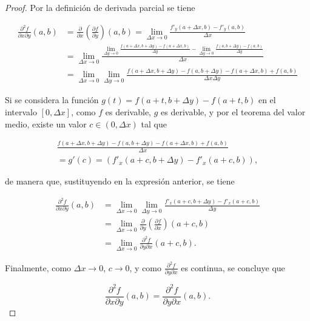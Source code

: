 \documentclass[
  a4paper,
]{scrreport}
\theoremstyle{definition}
\theoremstyle{plain}
\theoremstyle{plain}
\theoremstyle{definition}
\theoremstyle{definition}
\theoremstyle{plain}
\theoremstyle{remark}
\begin{document}
\begin{tcolorbox}[enhanced jigsaw, breakable, title=\textcolor{quarto-callout-note-color}{\faInfo}\hspace{0.5em}{Demostración}, toprule=.15mm, coltitle=black, arc=.35mm, rightrule=.15mm, colframe=quarto-callout-note-color-frame, colbacktitle=quarto-callout-note-color!10!white, toptitle=1mm, titlerule=0mm, leftrule=.75mm, opacityback=0, colback=white, bottomrule=.15mm, bottomtitle=1mm, left=2mm, opacitybacktitle=0.6]

\begin{proof}

Por la definición de derivada parcial se tiene

\begin{align*}
\frac{\partial^2 f}{\partial x \partial y} (a,b)
&= \frac{\partial}{\partial x}\left(\frac{\partial f}{\partial y}\right)(a,b) 
= \lim_{\Delta x\to 0} \frac{f'_y(a+\Delta x,b)-f'_y(a,b)}{\Delta x} \\
&= \lim_{\Delta x\to 0} \frac{\lim_{\Delta y\to 0}\frac{f(a+\Delta x,b+\Delta y)-f(a+\Delta x,b)}{\Delta y} - \lim_{\Delta y\to 0}\frac{f(a,b+\Delta y)-f(a,b)}{\Delta y}}{\Delta x} \\
&= \lim_{\Delta x\to 0}\lim_{\Delta y\to 0} \frac{f(a+\Delta x, b+\Delta y)- f(a,b+\Delta y) -f(a+\Delta x, b) + f(a,b)}{\Delta x \Delta y}
\end{align*}

Si se considera la función \(g(t) = f(a+t, b+\Delta y)-f(a+t,b)\) en el
intervalo \([0,\Delta x]\), como \(f\) es derivable, \(g\) es derivable,
y por el teorema del valor medio, existe un valor \(c\in (0,\Delta x)\)
tal que

\[
\begin{gathered}
\frac{f(a+\Delta x, b+\Delta y)- f(a,b+\Delta y) -f(a+\Delta x, b) + f(a,b)}{\Delta x} \\
= g'(c)
= (f'_x(a+c, b+\Delta y) - f'_x(a+c,b)),
\end{gathered}
\]

de manera que, sustituyendo en la expresión anterior, se tiene

\begin{align*}
\frac{\partial^2 f}{\partial x \partial y} (a,b)
&= \lim_{\Delta x\to 0}\lim_{\Delta y\to 0} \frac{f'_x(a+c, b+\Delta y) - f'_x(a+c,b)}{\Delta y} \\
&= \lim_{\Delta x\to 0}\frac{\partial}{\partial y}\left(\frac{\partial f}{\partial x}\right)(a+c, b) \\
&= \lim_{\Delta x\to 0}\frac{\partial^2 f}{\partial y\partial x}(a+c, b).
\end{align*}

Finalmente, como \(\Delta x \to 0\), \(c\to 0\), y como
\(\frac{\partial^2 f}{\partial y\partial x}\) es continua, se concluye
que

\[
\frac{\partial^2 f}{\partial x \partial y} (a,b) = \frac{\partial^2 f}{\partial y \partial x} (a,b).
\]

\end{proof}

\end{tcolorbox}
\end{document}
